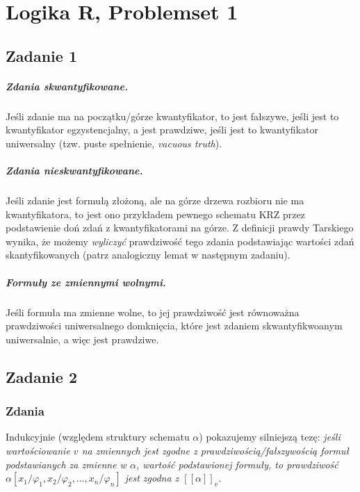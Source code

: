 \chapter{Logika R, Problemset 1}

\section*{Zadanie 1}

\paragraph{Zdania skwantyfikowane.} Jeśli zdanie ma na początku/górze kwantyfikator, to jest fałszywe, jeśli jest to kwantyfikator egzystencjalny, a jest prawdziwe, jeśli jest to kwantyfikator uniwersalny (tzw. puste spełnienie, \textit{vacuous truth}).

\paragraph{Zdania nieskwantyfikowane.} Jeśli zdanie jest formułą złożoną, ale na górze drzewa rozbioru nie ma kwantyfikatora, to jest ono przykładem pewnego schematu KRZ przez podstawienie doń zdań z kwantyfikatorami na górze. Z definicji prawdy Tarskiego wynika, że możemy \textit{wyliczyć} prawdziwość tego zdania podstawiając wartości zdań skantyfikowanych (patrz analogiczny lemat w następnym zadaniu).

\paragraph{Formuły ze zmiennymi wolnymi.}  Jeśli formuła ma zmienne wolne, to jej prawdziwość jest równoważna prawdziwości uniwersalnego domknięcia, które jest zdaniem skwantyfikwoanym uniwersalnie, a więc jest prawdziwe.

\section*{Zadanie 2}

\subsection*{Zdania} Indukcyjnie (względem struktury schematu \( \alpha \)) pokazujemy silniejszą tezę: \textit{jeśli wartościowanie \( v \) na zmiennych jest zgodne z prawdziwością/fałszywością formuł podstawianych za zmienne w \( \alpha \), wartość podstawionej formuły, to prawdziwość \( \alpha[x_1/\varphi_1, x_2/\varphi_2, \ldots, x_n/\varphi_n] \) jest zgodna z \( [[\alpha]]_v \)}.

